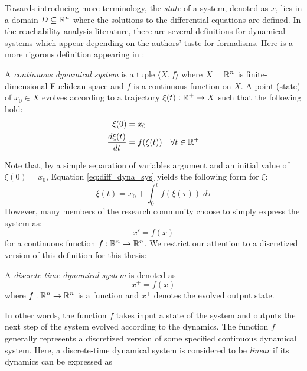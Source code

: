 Towards introducing more terminology, the \emph{state} of a system, denoted as $x$, lies in a domain $D \subseteq {\mathbb{R}}^n$ where the solutions to the differential equations are defined.
%
In the reachability analysis literature, there are several definitions for dynamical systems which appear depending on the authors' taste for formalisms. Here is a more rigorous definition appearing in \cite{dang1998reachability}:
\begin{definition}
\label{def:diff_dyna_sys}
A \emph{continuous dynamical system} is a tuple $\langle X, f \rangle$ where $X = {\mathbb{R}}^n$ is finite-dimensional Euclidean space and $f$ is a continuous function on $X$. A point (state) of $x_0 \in X$ evolves according to a trajectory $\xi(t): {\mathbb{R}}^+ \rightarrow X$ such that the following hold:
%
\begin{equation}
  \label{eq:diff_dyna_sys}
  \begin{split}
    \xi(0) & = x_0 \\
    \frac{d \xi(t)}{dt} & = f(\xi(t)) \quad \forall t \in {\mathbb{R}}^+
  \end{split}
\end{equation}
\end{definition}
%
\noindent Note that, by a simple separation of variables argument and an initial value of $\xi(0) = x_0$, Equation \ref{eq:diff_dyna_sys} yields the following form for $\xi$:
\begin{equation}
\xi(t) = x_0 + \int_0^t f(\xi(\tau))\; d\tau
\end{equation}
%
\noindent However, many members of the research community choose to simply express the system as:
\begin{equation}
\label{eq:cont_dynas}
x' = f(x)
\end{equation}
for a continuous function $f:{\mathbb{R}}^n \rightarrow {\mathbb{R}}^n$. We restrict our attention to a discretized version of this definition for this thesis:
%
\begin{definition}
A \emph{discrete-time dynamical system} is denoted as
\begin{equation}
  x^{+} = f(x)
\label{eq:sys}
\end{equation}
where $f: {\mathbb{R}}^{n} \rightarrow {\mathbb{R}}^{n}$ is a function and $x^{+}$ denotes the evolved output state.
\end{definition}
%
 In other words, the function $f$ takes input a state of the system and outputs the next step of the system evolved according to the dynamics.
%
 The function $f$ generally represents a discretized version of some specified continuous dynamical system. Here, a discrete-time dynamical system is considered to be \emph{linear} if its dynamics can be expressed as

